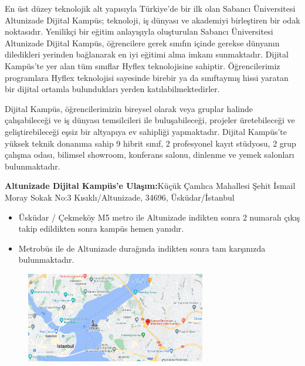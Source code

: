 En üst düzey teknolojik alt yapısıyla Türkiye’de bir ilk olan Sabancı Üniversitesi Altunizade Dijital Kampüs; teknoloji, iş dünyası ve akademiyi birleştiren bir odak noktasıdır.
Yenilikçi bir eğitim anlayışıyla oluşturulan Sabancı Üniversitesi Altunizade Dijital Kampüs, öğrencilere gerek sınıfın içinde gerekse dünyanın diledikleri yerinden bağlanarak en
iyi eğitimi alma imkanı sunmaktadır. Dijital Kampüs’te yer alan tüm sınıflar Hyflex teknolojisine sahiptir.
Öğrencilerimiz programlara Hyflex teknolojisi sayesinde birebir ya da sınıftaymış hissi yaratan bir dijital ortamla bulundukları yerden katılabilmektedirler.

Dijital Kampüs, öğrencilerimizin bireysel olarak veya gruplar halinde çalışabileceği ve iş dünyası temsilcileri ile buluşabileceği, projeler üretebileceği ve geliştirebileceği eşsiz bir altyapıya ev sahipliği yapmaktadır.
Dijital Kampüs’te yüksek teknik donanıma sahip 9 hibrit sınıf, 2 profesyonel kayıt stüdyosu, 2 grup çalışma odası, bilimsel showroom, konferans salonu, dinlenme ve yemek salonları bulunmaktadır.

\textbf{Altunizade Dijital Kampüs'e Ulaşım:}\newline Küçük Çamlıca Mahallesi Şehit İsmail Moray Sokak No:3 Kısıklı/Altunizade, 34696, Üsküdar/İstanbul

\begin{itemize}
	\item Üsküdar / Çekmeköy M5 metro ile Altunizade indikten sonra 2 numaralı çıkış takip edildikten sonra kampüs hemen yanıdır.
	\item Metrobüs ile de Altunizade durağında indikten sonra tam karşınızda bulunmaktadır.
\end{itemize}

\begin{figure}
\centering
\includegraphics[width=0.7\textwidth]{altunizade_2.png}
\end{figure}
